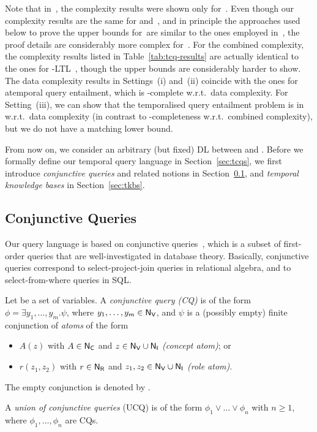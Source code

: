 Note that in~\cite{BaBL-LTCS-13-01,BaBL-CADE13}, the complexity results were
shown only for~\ALC.  Even though our complexity results are the same for \ALC
and~\SHQ, and in principle the approaches used below to prove
the upper bounds for~\SHQ are similar to the ones employed
in~\cite{BaBL-LTCS-13-01,BaBL-CADE13}, the proof details are considerably more
complex for~\SHQ.
%
For the combined complexity, the complexity results listed in
Table~\ref{tab:tcq-results} are actually identical to the ones for
\ALC-LTL~\cite{BaGL-ToCL12}, though the upper bounds are considerably harder to
show.  The data complexity results in Settings~(i) and~(ii) coincide with the
ones for atemporal query entailment, which is \coNP-complete w.r.t.\ data
complexity.  For Setting~(iii), we can show that the temporalised query
entailment problem is in \ExpTime w.r.t.\ data complexity (in contrast to
\TwoExpTime-completeness w.r.t.\ combined complexity), but we do not have a
matching lower bound.

From now on, we consider an arbitrary (but fixed) DL between \ALC and \SHQ.
Before we formally define our temporal query language in Section~\ref{sec:tcqs},
we first introduce \emph{conjunctive queries} and related notions in
Section~\ref{sec:cqs}, and \emph{temporal knowledge bases} in
Section~\ref{sec:tkbs}.


\subsection{Conjunctive Queries}\label{sec:cqs}

Our query language is based on conjunctive queries~\cite{AbHV-95}, which is a
subset of first-order queries that are well-investigated in database theory.
Basically, conjunctive queries correspond to select-project-join queries in
relational algebra, and to select-from-where queries in SQL\@.

\begin{definition}\label{def:syntax-cqs}
    Let \NV be a set of variables. A \emph{conjunctive query (CQ)} is
    of the form $\phi=\exists y_1,\dots,y_m.\psi$, where $y_1,\dots,y_m\in\mathsf{N_V}$,
    and $\psi$ is a (possibly empty) finite conjunction of \emph{atoms} of the
    form
    \begin{itemize}
        \item $A(z)$ with $A\in\mathsf{N_C}$ and $z\in\mathsf{N_V}\cup\mathsf{N_I}$ \emph{(concept atom)};
            or
        \item $r(z_1,z_2)$ with $r\in\mathsf{N_R}$ and $z_1,z_2\in\mathsf{N_V}\cup\mathsf{N_I}$ \emph{(role
            atom)}.
    \end{itemize}
    The empty conjunction is denoted by \true.

    A \emph{union of conjunctive queries} (UCQ) is of the form
    $\phi_1\lor\dots\lor\phi_n$ with $n\ge 1$, where $\phi_1,\dots,\phi_n$ are
    CQs.
\end{definition}

